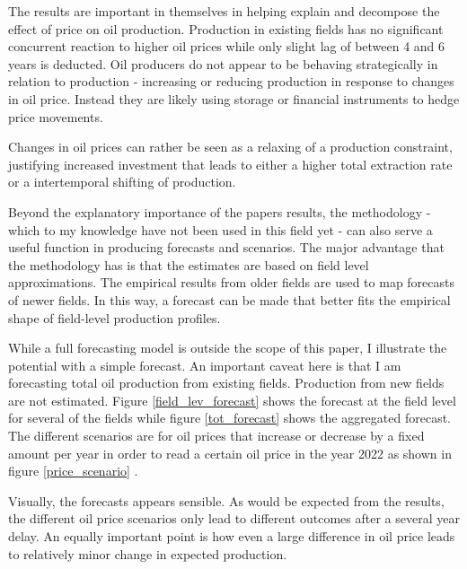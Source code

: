 \documentclass[12pt]{scrartcl} %
\begin{document}
The results are important in themselves in helping explain and decompose the effect of price on oil production.  Production in existing fields has no significant concurrent reaction to higher oil prices while only slight lag of between 4 and 6 years is deducted.  Oil producers do not appear to be behaving strategically in relation to production - increasing or reducing production in response to changes in oil price.  Instead they are likely using storage or financial instruments to hedge price movements.  

Changes in oil prices can rather be seen as a relaxing of a production constraint, justifying increased investment that leads to either a higher total extraction rate or a intertemporal shifting of production.  

Beyond the explanatory importance of the papers results, the methodology - which to my knowledge have not been used in this field yet - can also serve a useful function in producing forecasts and scenarios.  The major advantage that the methodology has is that the estimates are based on field level approximations.  The empirical results from older fields are used to map forecasts of newer fields.  In this way, a forecast can be made that better fits the empirical shape of field-level production profiles.  

While a full forecasting model is outside the scope of this paper, I illustrate the potential with a simple forecast.  An important caveat here is that I am forecasting total oil production from existing fields.  Production from new fields are not estimated.  Figure \ref{field_lev_forecast} shows the forecast at the field level for several of the fields while figure \ref{tot_forecast} shows the aggregated forecast.  The different scenarios are for oil prices that increase or decrease by a fixed amount per year in order to read a certain oil price in the year 2022 as shown in figure \ref{price_scenario} .  

Visually, the forecasts appears sensible.  As would be expected from the results, the different oil price scenarios only lead to different outcomes after a several year delay.  An equally important point is how even a large difference in oil price leads to relatively minor change in expected production.   





\end{document}
